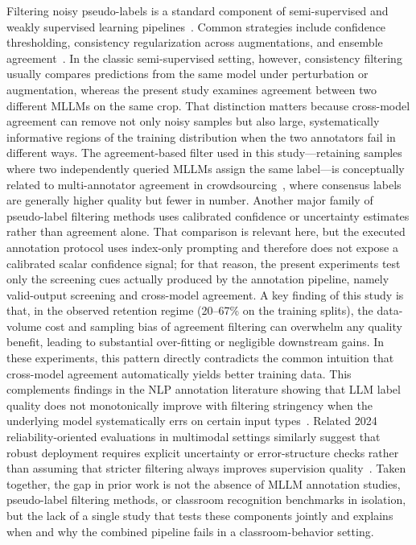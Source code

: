 \documentclass[10pt,letterpaper]{article}
\begin{document}
Filtering noisy pseudo-labels is a standard component of
semi-supervised and weakly supervised learning
pipelines~\cite{sohn2020fixmatch,zhang2021flexmatch}.
Common strategies include confidence thresholding, consistency
regularization across augmentations, and ensemble
agreement~\cite{laine2016temporal}.
In the classic semi-supervised setting, however, consistency filtering
usually compares predictions from the same model under perturbation or
augmentation, whereas the present study examines agreement between two
different MLLMs on the same crop.
That distinction matters because cross-model agreement can remove not
only noisy samples but also large, systematically informative regions
of the training distribution when the two annotators fail in different
ways.
The agreement-based filter used in this study---retaining samples where two independently
queried MLLMs assign the same label---is conceptually related to
multi-annotator agreement in crowdsourcing~\cite{snow2008cheap}, where
consensus labels are generally higher quality but fewer in number.
Another major family of pseudo-label filtering methods uses calibrated
confidence or uncertainty estimates rather than agreement alone.
That comparison is relevant here, but the executed annotation protocol
uses index-only prompting and therefore does not expose a calibrated
scalar confidence signal; for that reason, the present experiments test
only the screening cues actually produced by the annotation pipeline,
namely valid-output screening and cross-model agreement.
A key finding of this study is that, in the observed retention regime
(20--67\% on the training splits), the data-volume cost and sampling
bias of agreement filtering can overwhelm any quality benefit, leading
to substantial over-fitting or negligible downstream gains.
In these experiments, this pattern directly contradicts the common
intuition that cross-model agreement automatically yields better
training data.
This complements findings in the NLP annotation literature showing that
LLM label quality does not monotonically improve with filtering
stringency when the underlying model systematically errs on certain
input types~\cite{he2023annollm}.
Related 2024 reliability-oriented evaluations in multimodal settings
similarly suggest that robust deployment requires explicit uncertainty
or error-structure checks rather than assuming that stricter filtering
always improves supervision quality~\cite{zhang2024zero,yue2024mmmu}.
Taken together, the gap in prior work is not the absence of MLLM
annotation studies, pseudo-label filtering methods, or classroom
recognition benchmarks in isolation, but the lack of a single study
that tests these components jointly and explains when and why the
combined pipeline fails in a classroom-behavior setting.
\end{document}
